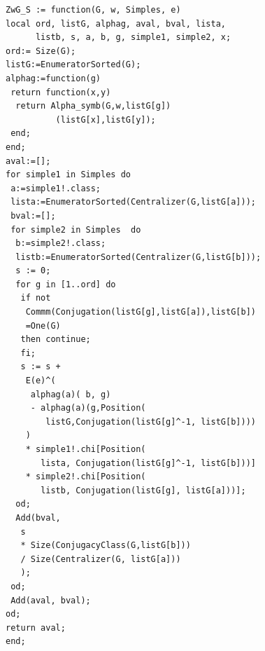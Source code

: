 \documentclass[11pt]{book}
\theoremstyle{Rem}
\theoremstyle{definition}
\numberwithin{equation}{section}
\begin{document}
\begin{lstlisting}
ZwG_S := function(G, w, Simples, e)
local ord, listG, alphag, aval, bval, lista, 
      listb, s, a, b, g, simple1, simple2, x;
ord:= Size(G);
listG:=EnumeratorSorted(G);
alphag:=function(g)
 return function(x,y)
  return Alpha_symb(G,w,listG[g]) 
          (listG[x],listG[y]);
 end;
end;
aval:=[];
for simple1 in Simples do
 a:=simple1!.class;
 lista:=EnumeratorSorted(Centralizer(G,listG[a]));
 bval:=[];
 for simple2 in Simples  do
  b:=simple2!.class;
  listb:=EnumeratorSorted(Centralizer(G,listG[b]));
  s := 0;
  for g in [1..ord] do
   if not 
    Commm(Conjugation(listG[g],listG[a]),listG[b])
    =One(G) 
   then continue;
   fi;
   s := s + 
    E(e)^(
     alphag(a)( b, g) 
     - alphag(a)(g,Position(
        listG,Conjugation(listG[g]^-1, listG[b])))
    ) 
    * simple1!.chi[Position(
       lista, Conjugation(listG[g]^-1, listG[b]))]
    * simple2!.chi[Position(
       listb, Conjugation(listG[g], listG[a]))];
  od;
  Add(bval, 
   s 
   * Size(ConjugacyClass(G,listG[b]))
   / Size(Centralizer(G, listG[a]))
   );  
 od;
 Add(aval, bval);
od;
return aval;
end;

\end{lstlisting}
\end{document}
